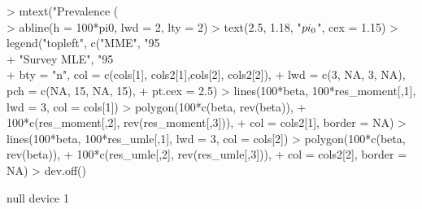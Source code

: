 \documentclass{article}
\begin{document}
\begin{Schunk}
\begin{Sinput}
> mtext("Prevalence (\\%)", side = 2, line = 3, cex = 1.15)
> abline(h = 100*pi0, lwd = 2, lty = 2)
> text(2.5, 1.18, "$\\pi_0$", cex = 1.15)
> legend("topleft", c("MME", "95\\% CI",
+                      "Survey MLE", "95\\% CI"),
+        bty = "n", col = c(cols[1], cols2[1],cols[2], cols2[2]),
+        lwd = c(3, NA, 3, NA), pch = c(NA, 15, NA, 15),
+        pt.cex = 2.5)
> lines(100*beta, 100*res_moment[,1], lwd = 3, col = cols[1])
> polygon(100*c(beta, rev(beta)),
+         100*c(res_moment[,2], rev(res_moment[,3])),
+         col = cols2[1], border = NA)
> lines(100*beta, 100*res_umle[,1], lwd = 3, col = cols[2])
> polygon(100*c(beta, rev(beta)),
+         100*c(res_umle[,2], rev(res_umle[,3])),
+         col = cols2[2], border = NA)
> dev.off()
\end{Sinput}
\begin{Soutput}
null device 
          1 
\end{Soutput}
\end{Schunk}

\begin{figure}

\end{figure}
\end{document}
